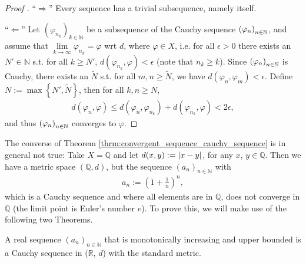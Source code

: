 \begin{proof}[Proof \cite{354965}]
	\enquote{$\Longrightarrow$} Every sequence has a trivial subsequence, namely itself.
	
	\enquote{$\Longleftarrow$} Let $\left(\varphi_{n_k}\right)_{k\in\mathbb N}$ be a subsequence of the Cauchy sequence $\seq[\varphi_n]$, and assume that $\lim\limits_{k\to\infty}\varphi_{n_k} = \varphi$ wrt $d$, where $\varphi\in X$, i.e. for all $\epsilon > 0$ there exists an $N'\in\mathbb N$ s.t. for all $k\geq N'$, $d(\varphi_{n_k}, \varphi) < \epsilon$ (note that $n_k \geq k$). Since $\seq[\varphi_n]$ is Cauchy, there exists an $\tilde{N}$ s.t. for all $m, n\geq \tilde{N}$, we have $d(\varphi_n, \varphi_m) < \epsilon$. Define $N := \max\left\{N', \tilde{N}\right\}$, then for all $k, n\geq N$,
	\begin{align*}
		d(\varphi_n, \varphi) \leq d(\varphi_n, \varphi_{n_k}) + d(\varphi_{n_k}, \varphi) < 2\epsilon,
	\end{align*}
	and thus $\seq[\varphi_n]$ converges to $\varphi$.
\end{proof}

\begin{remark}\label{remark:cauchy_not_convergent_necess}
	The converse of Theorem \ref{thrm:convergent_sequence_cauchy_sequence} is in general not true: Take $X=\mathbb Q$ and let $d(x, y) := \abs{x - y}$, for any $x$, $y\in\mathbb Q$. Then we have a metric space $(\mathbb Q, d)$, but the sequence $(a_n)_{n\in\mathbb N}$ with
	\begin{align}\label{eq:seq_euler}
		a_n := \left(1 + \frac{1}{n}\right)^n,
	\end{align}
	which is a Cauchy sequence and where all elements are in $\mathbb Q$, does not converge in $\mathbb Q$ (the limit point is Euler's number $e$). To prove this, we will make use of the following two Theorems.
\end{remark}

\begin{theorem}\label{thrm:mono_inc_seq_Cauchy}
	A real sequence $(a_n)_{n\in\mathbb N}$ that is monotonically increasing and upper bounded is a Cauchy sequence in ($\mathbb R$, $d$) with the standard metric.
\end{theorem}

